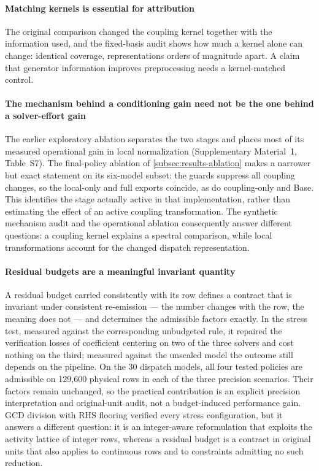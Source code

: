 \documentclass[11pt]{article}
\theoremstyle{definition}
\theoremstyle{remark}
\begin{document}
\paragraph{Matching kernels is essential for attribution} The original comparison changed the
coupling kernel together with the information used, and the fixed-basis audit shows how much a
kernel alone can change: identical coverage, representations orders of magnitude apart. A claim
that generator information improves preprocessing needs a kernel-matched control.

\paragraph{The mechanism behind a conditioning gain need not be the one behind a solver-effort
gain} The earlier exploratory ablation separates the two stages and places most of
its measured operational gain in local normalization (Supplementary Material~1, Table~S7).
The final-policy ablation of \cref{subsec:results-ablation} makes a narrower but exact
statement on its six-model subset: the guards suppress all coupling changes, so the
local-only and full exports coincide, as do coupling-only and Base. This identifies the
stage actually active in that implementation, rather than estimating the effect of an
active coupling transformation. The synthetic mechanism audit and the operational
ablation consequently answer different questions: a coupling kernel explains a spectral
comparison, while local transformations account for the changed dispatch representation.

\paragraph{Residual budgets are a meaningful invariant quantity} A residual budget carried
consistently with its row defines a contract that is invariant under consistent re-emission ---
the number changes with the row, the meaning does not --- and determines the admissible factors
exactly. In the
stress test, measured against the corresponding unbudgeted rule, it repaired the verification
losses of coefficient centering on two of the three solvers and cost nothing on the third;
measured against the unscaled model the outcome still depends on the pipeline. On the 30 dispatch models, all four tested policies are admissible on 129,600 physical
rows in each of the three precision scenarios. Their factors remain unchanged, so the
practical contribution is an explicit precision interpretation and original-unit audit,
not a budget-induced performance gain. GCD division with RHS flooring verified every stress configuration, but it
answers a different question: it is an integer-aware reformulation that exploits the activity
lattice of integer rows, whereas a residual budget is a contract in original units that also
applies to continuous rows and to constraints admitting no such reduction.
\end{document}
